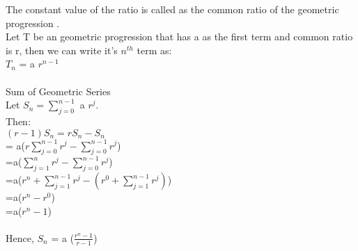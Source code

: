 \documentclass{article}
\begin{document}
 The constant value of the ratio is called as the common ratio of the geometric progression .
 \\Let T be an geometric progression that has a as the first term and common ratio is r, then we can write it's $n^{th}$ term as:
 \\$T_{n}$ = a $r^{n-1}$
 \\
 \\
 {\large Sum of Geometric Series } ~\cite{wiki}
 \vspace{2.5mm}
\\Let $S_n = \sum_{j \mathop = 0}^{n - 1}$ a $r^j$.
\\Then:
\\$(r - 1) S_n =r S_n - S_n$
\\ \hspace*{14mm} = a($r \sum_{j \mathop = 0}^{n - 1} r^j - \sum_{j \mathop = 0}^{n - 1} r^j$)
\\ \hspace*{14mm}  =a($ \sum_{j \mathop = 1}^n r^j - \sum_{j \mathop = 0}^{n - 1} r^j $)
\\ \hspace*{14mm}  =a($r^n + \sum_{j \mathop = 1}^{n-1} r^j - \left({r^0 + \sum_{j \mathop = 1}^{n - 1} r^j}\right)$)
\\ \hspace*{14mm}  =a($r^n - r^0$)
\\ \hspace*{14mm}  =a($r^n - 1 $)
\\
\\ Hence, $S_n$ = a ($\frac{r^n -1}{r-1}$)
\vspace{10mm}
{}

\end{document}
